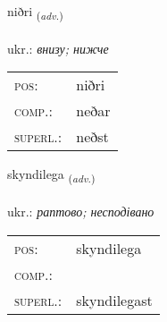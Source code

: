 \documentclass[frontgrid, backgrid]{flacards}\usepackage[]{graphicx}\usepackage[]{xcolor}
\begin{document}
\renewcommand{\flhead}{\vskip5pt \fboxsep=0pt {\small\bfseries\footnotesize Atviksorð | прислівник}}
\renewcommand{\fcfoot}{\vskip5pt \fboxsep=0pt \hspace{2pt}{\small\bfseries\footnotesize 2K}}

\renewcommand{\blhead}{\vskip5pt {\small\bfseries\footnotesize Atviksorð | прислівник }}
\renewcommand{\bcfoot}{\vskip5pt \hspace{2pt}{\small\bfseries\footnotesize 2K}}


{niðri \small{\textsubscript{(\textit{adv.})}} \\[1ex] %
\textphonetic{[nɪðrɪ]} \\
ukr.: \emph{внизу; нижче} \\  [2ex]
\renewcommand*{\arraystretch}{0.8}
\begin{tabular}{ll}
\textsc{pos}: & niðri \\ 
\textsc{comp.}: & neðar \\ 
\textsc{superl.}: & neðst \\
\end{tabular}
}

\renewcommand{\flhead}{\vskip5pt \fboxsep=0pt {\small\bfseries\footnotesize Atviksorð | прислівник}}
\renewcommand{\fcfoot}{\vskip5pt \fboxsep=0pt \hspace{2pt}{\small\bfseries\footnotesize 2K}}

\renewcommand{\blhead}{\vskip5pt {\small\bfseries\footnotesize Atviksorð | прислівник }}
\renewcommand{\bcfoot}{\vskip5pt \hspace{2pt}{\small\bfseries\footnotesize 2K}}


{skyndilega \small{\textsubscript{(\textit{adv.})}} \\[1ex] %
\textphonetic{[scɪntɪlɛɣa]} \\
ukr.: \emph{раптово; несподівано} \\  [2ex]
\renewcommand*{\arraystretch}{0.8}
\begin{tabular}{ll}
\textsc{pos}: & skyndilega \\ 
\textsc{comp.}: &  \\ 
\textsc{superl.}: & skyndilegast \\
\end{tabular}
}
\end{document}
